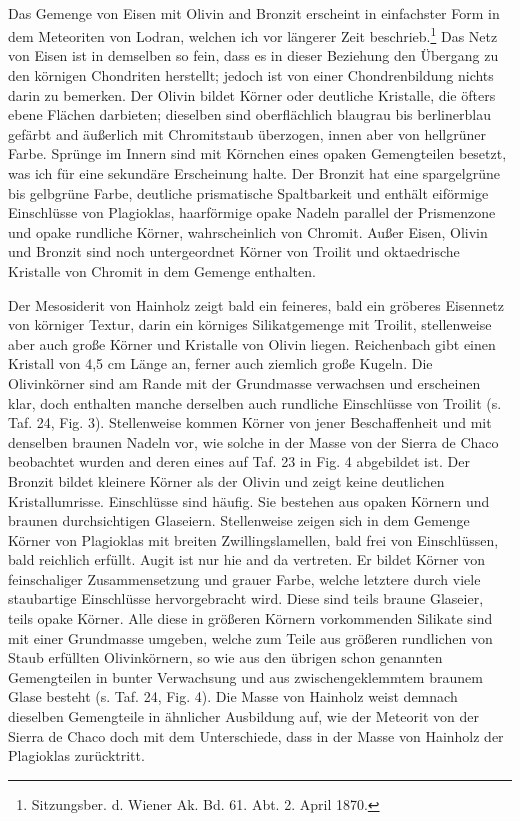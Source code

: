 \documentclass[a4paper, 11pt, oneside, polutonikogreek, german]{article}
\begin{document}
\paragraph{}
Das Gemenge von Eisen mit Olivin and Bronzit erscheint in einfachster Form in dem Meteoriten von Lodran, welchen ich vor längerer Zeit beschrieb.\footnote{Sitzungsber. d. Wiener Ak. Bd. 61. Abt. 2. April 1870.} Das Netz von Eisen ist in demselben so fein, dass es in dieser Beziehung den Übergang zu den körnigen Chondriten herstellt; jedoch ist von einer Chondrenbildung nichts darin zu bemerken. Der Olivin bildet Körner oder deutliche Kristalle, die öfters ebene Flächen darbieten; dieselben sind oberflächlich blaugrau bis berlinerblau gefärbt and äußerlich mit Chromitstaub überzogen, innen aber von hellgrüner Farbe. Sprünge im Innern sind mit Körnchen eines opaken Gemengteilen besetzt, was ich für eine sekundäre Erscheinung halte. Der Bronzit hat eine spargelgrüne bis gelbgrüne Farbe, deutliche prismatische Spaltbarkeit und enthält eiförmige Einschlüsse von Plagioklas, haarförmige opake Nadeln parallel der Prismenzone und opake rundliche Körner, wahrscheinlich von Chromit. Außer Eisen, Olivin und Bronzit sind noch untergeordnet Körner von Troilit und oktaedrische Kristalle von Chromit in dem Gemenge enthalten.

Der Mesosiderit von Hainholz zeigt bald ein feineres, bald ein gröberes Eisennetz von körniger Textur, darin ein körniges Silikatgemenge mit Troilit, stellenweise aber auch große Körner und Kristalle von Olivin liegen. Reichenbach gibt einen Kristall von 4,5 cm Länge an, ferner auch ziemlich große Kugeln. Die Olivinkörner sind am Rande mit der Grundmasse verwachsen und erscheinen klar, doch enthalten manche derselben auch rundliche Einschlüsse von Troilit (s. Taf. 24, Fig. 3). Stellenweise kommen Körner von jener Beschaffenheit und mit denselben braunen Nadeln vor, wie solche in der Masse von der Sierra de Chaco beobachtet wurden and deren eines auf Taf. 23 in Fig. 4 abgebildet ist. Der Bronzit bildet kleinere Körner als der Olivin und zeigt keine deutlichen Kristallumrisse. Einschlüsse sind häufig. Sie bestehen aus opaken Körnern und braunen durchsichtigen Glaseiern. Stellenweise zeigen sich in dem Gemenge Körner von Plagioklas mit breiten Zwillingslamellen, bald frei von Einschlüssen, bald reichlich erfüllt. Augit ist nur hie and da vertreten. Er bildet Körner von feinschaliger Zusammensetzung und grauer Farbe, welche letztere durch viele staubartige Einschlüsse hervorgebracht wird. Diese sind teils braune Glaseier, teils opake Körner. Alle diese in größeren Körnern vorkommenden Silikate sind mit einer Grundmasse umgeben, welche zum Teile aus größeren rundlichen von Staub erfüllten Olivinkörnern, so wie aus den übrigen schon genannten Gemengteilen in bunter Verwachsung und aus zwischengeklemmtem braunem Glase besteht (s. Taf. 24, Fig. 4). Die Masse von Hainholz weist demnach dieselben Gemengteile in ähnlicher Ausbildung auf, wie der Meteorit von der Sierra de Chaco doch mit dem Unterschiede, dass in der Masse von Hainholz der Plagioklas zurücktritt.
\end{document}
